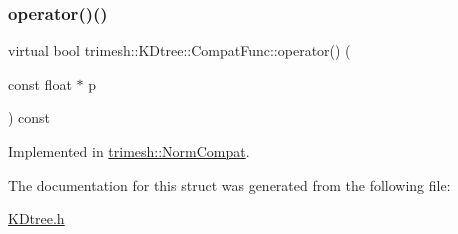 \subsubsection{\texorpdfstring{operator()()}{operator()()}}
{\footnotesize\ttfamily virtual bool trimesh\+::\+K\+Dtree\+::\+Compat\+Func\+::operator() (\begin{DoxyParamCaption}\item[{const float $\ast$}]{p }\end{DoxyParamCaption}) const\hspace{0.3cm}{\ttfamily [pure virtual]}}



Implemented in \hyperlink{classtrimesh_1_1NormCompat_a189eaeb454dd63b4443661665b6500ee}{trimesh\+::\+Norm\+Compat}.



The documentation for this struct was generated from the following file\+:\begin{DoxyCompactItemize}
\item 
\hyperlink{KDtree_8h}{K\+Dtree.\+h}\end{DoxyCompactItemize}
